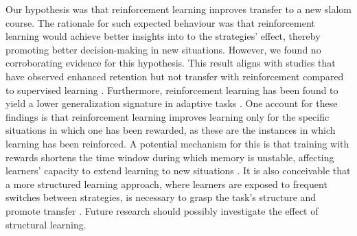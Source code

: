 Our hypothesis was that reinforcement learning improves transfer to a new slalom course. The rationale for such expected behaviour was that reinforcement learning would achieve better insights into to the strategies' effect, thereby promoting better decision-making in new situations. However, we found no corroborating evidence for this hypothesis. This result aligns with studies that have observed enhanced retention but not transfer with reinforcement compared to supervised learning \cite{hasson_reinforcement_2015}. Furthermore, reinforcement learning has been found to yield a lower generalization signature in adaptive tasks \cite{lior_shmuelof_overcoming_2012}. One account for these findings is that reinforcement learning improves learning only for the specific situations in which one has been rewarded, as these are the instances in which learning has been reinforced. A potential mechanism for this is that training with rewards shortens the time window during which memory is unstable, affecting learners' capacity to extend learning to new situations \cite{robertson_memory_2018}. It is also conceivable that a more structured learning approach, where learners are exposed to frequent switches between strategies, is necessary to grasp the task's structure and promote transfer \cite{braun_structure_2010}. Future research should possibly investigate the effect of structural learning. 


